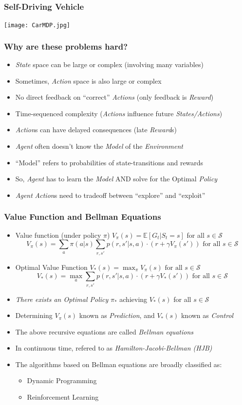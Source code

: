 \documentclass[handout]{beamer}
\begin{document}
\begin{frame}
\frametitle{Self-Driving Vehicle}
\texttt{[image: CarMDP.jpg]}
\end{frame}

\begin{frame}
\frametitle{Why are these problems hard?}
\pause
\begin{itemize}[<+->]
\item {\em State} space can be large or complex (involving many variables)
\item Sometimes, {\em Action} space is also large or complex
\item No direct feedback on ``correct'' {\em Actions} (only feedback is {\em Reward})
\item Time-sequenced complexity ({\em Actions} influence future {\em States/Actions})
\item {\em Action}s can have delayed consequences (late {\em Reward}s)
\item {\em Agent} often doesn't know the {\em Model} of the {\em Environment}
\item ``Model'' refers to probabilities of state-transitions and rewards
\item So, {\em Agent} has to learn the {\em Model} AND solve for the Optimal {\em Policy}
\item {\em Agent} {\em Action}s need to tradeoff between ``explore'' and ``exploit''
\end{itemize}
\end{frame}

\begin{frame}
\frametitle{Value Function and Bellman Equations}
\pause
\begin{itemize}
\item Value function (under policy $\pi$) $V_{\pi}(s) = \mathbb{E}[G_t|S_t = s]$ for all $s \in \mathcal{S}$
\pause
$$V_{\pi}(s) = \sum_{a} \pi(a|s) \sum_{r,s'} p(r,s'|s,a) \cdot (r + \gamma V_{\pi}(s')) \mbox{ for all } s \in \mathcal{S}$$
\pause
\item Optimal Value Function $V_{*}(s) = \max_{\pi} V_{\pi}(s) \mbox{ for all } s \in \mathcal{S}$
\pause
$$V_{*}(s) = \max_{a} \sum_{r,s'} p(r,s'|s,a) \cdot (r + \gamma V_{*}(s')) \mbox{ for all } s \in \mathcal{S}$$
\pause
\item {\em There exists an Optimal Policy} $\pi_{*}$ achieving $V_{*}(s)$ for all $s \in \mathcal{S}$
\pause
\item Determining $V_{\pi}(s)$ known as {\em Prediction}, and $V_{*}(s)$ known as {\em Control}
\pause
\item The above recursive equations are called {\em Bellman equations}
\pause
\item In continuous time, refered to as {\em Hamilton-Jacobi-Bellman (HJB)}
\pause
\item The algorithms based on Bellman equations are broadly classified as:
\begin{itemize}
\item Dynamic Programming
\item Reinforcement Learning
\end{itemize}

\end{itemize}
\end{frame}
\end{document}
